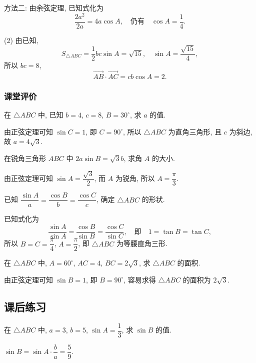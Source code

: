     方法二: 由余弦定理, 
    已知式化为
    \[\frac{2a^2}{2a}= 4a\cos A,\quad\text{仍有}\quad
    \cos A= \frac14.\]

    (2) 由已知, 
    \[S_{\triangle ABC}= \dfrac12 bc\sin A=\sqrt{15},\quad
        \sin A= \frac{\sqrt{15}}{4},\]
    所以 $bc=8$,
    \[\overrightarrow{AB}\cdot\overrightarrow{AC}
        = cb\cos A= 2.\]
\endsolution

\subsubsection{课堂评价}
\begin{exercise}
    在 $\triangle ABC$ 中, 已知 $b=4$, $c=8$, $B=30^\circ$, 求 $a$ 的值.
\end{exercise}
\beginsolution
    由正弦定理可知 $\sin C=1$, 
    即 $C=90^\circ$, 所以 $\triangle ABC$ 为直角三角形, 且 $c$ 为斜边, 故 $a=4\sqrt3$.
\endsolution

\begin{exercise}
    在锐角三角形 $ABC$ 中 $2a\sin B=\sqrt3 b$, 求角 $A$ 的大小.
\end{exercise}
\beginsolution
    由正弦定理可知 $\sin A= \dfrac{\sqrt3}{2}$, 而 $A$ 为锐角, 所以 $A= \dfrac\pi3$.
\endsolution

\begin{exercise}
    已知 $\dfrac{\sin A}a= \dfrac{\cos B}b= \dfrac{\cos C}c$, 
    确定 $\triangle ABC$ 的形状.
\end{exercise}
\beginsolution
    已知式化为
    \[\dfrac{\sin A}{\sin A}= \dfrac{\cos B}{\sin B}
        = \dfrac{\cos C}{\sin C},\quad\text{即}\quad
        1= \tan B= \tan C,\]
    所以 $B=C=\dfrac\pi4$, $A=\dfrac\pi2$, 即 $\triangle ABC$ 为等腰直角三形.
\endsolution

\begin{exercise}
    在 $\triangle ABC$ 中, $A=60^\circ$, $AC=4$, $BC=2\sqrt3$, 
    求 $\triangle ABC$ 的面积.
\end{exercise}
\beginsolution
    由正弦定理可知 $\sin B= 1$, 即 $B=90^\circ$, 容易求得 $\triangle ABC$ 的面积为 $2\sqrt3$.
\endsolution

\subsection{课后练习}
\begin{exercise}
    在 $\triangle ABC$ 中, $a=3$, $b=5$, $\sin A=\dfrac13$, 
    求 $\sin B$ 的值.
\end{exercise}
\beginsolution
    $\sin B= \sin A\cdot \dfrac{b}{a}= \dfrac59$.
\endsolution

